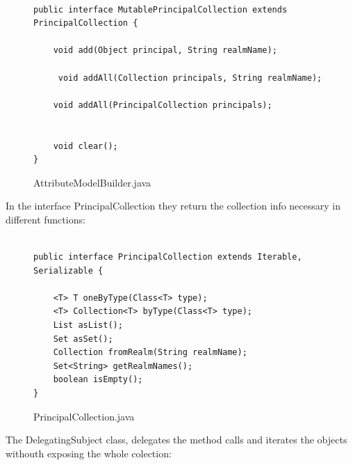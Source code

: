 \begin{figure}[!tbp]
\centering
\lstset{language=Java, stepnumber=1, showspaces=false, showstringspaces=false,breaklines=true}
\begin{lstlisting}

public interface MutablePrincipalCollection extends PrincipalCollection {

    void add(Object principal, String realmName);

     void addAll(Collection principals, String realmName);

    void addAll(PrincipalCollection principals);


    void clear();
}
\end{lstlisting}
\caption{AttributeModelBuilder.java}
\label{AttributeModelBuilder}
\end{figure}

In the interface PrincipalCollection they return the collection info necessary in different functions:

\begin{figure}[!tbp]
\centering
\lstset{language=Java, stepnumber=1, showspaces=false, showstringspaces=false,breaklines=true}
\begin{lstlisting}

public interface PrincipalCollection extends Iterable, Serializable {

    <T> T oneByType(Class<T> type);
    <T> Collection<T> byType(Class<T> type);
    List asList();
    Set asSet();
    Collection fromRealm(String realmName);
    Set<String> getRealmNames();
    boolean isEmpty();
}

\end{lstlisting}
\caption{PrincipalCollection.java}
\label{PrincipalCollection}
\end{figure}

The DelegatingSubject class, delegates the method calls and iterates the objects withouth exposing the whole colection:

